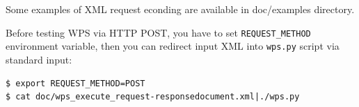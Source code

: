 \documentclass[a4paper,11pt]{article}
\begin{document}
Some examples of XML request econding are available in doc/examples
directory.

Before testing WPS via HTTP POST, you have to set \texttt{REQUEST\_METHOD}
environment variable, then you can redirect input XML into \texttt{wps.py}
script via standard input:

\begin{verbatim}
$ export REQUEST_METHOD=POST
$ cat doc/wps_execute_request-responsedocument.xml|./wps.py
\end{verbatim}
\end{document}

